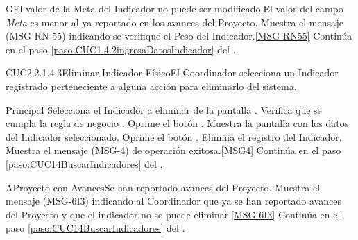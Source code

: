 	\begin{UCtrayectoriaA}{G}{El valor de la Meta del Indicador no puede ser modificado.}{El valor del campo \textit{Meta} es menor al ya reportado en los avances del Proyecto.}
			\UCpaso Muestra el mensaje (MSG-RN-55) indicando se verifique el Peso del Indicador.\ref{MSG-RN55}
			\UCpaso Continúa en el paso \ref{paso:CUC1.4.2ingresaDatosIndicador} del .
	\end{UCtrayectoriaA}
	\begin{UseCase}{CUC2.2.1.4.3}{Eliminar Indicador Físico}{El Coordinador selecciona un Indicador registrado perteneciente a alguna acción para eliminarlo del sistema.}
	\end{UseCase}

	\begin{UCtrayectoria}{Principal}
			\UCpaso [\UCactor] Selecciona el Indicador a eliminar de la pantalla  .
			\UCpaso Verifica que se cumpla la regla de negocio .
			\UCpaso[\UCactor] Oprime el botón .
			\UCpaso Muestra la pantalla  con los datos del Indicador seleccionado.
			\UCpaso [\UCactor] Oprime el botón . 
			\UCpaso Elimina el registro del Indicador.
			\UCpaso Muestra el mensaje (MSG-4) de operación exitosa.\ref{MSG4}
			\UCpaso Continúa en el paso \ref{paso:CUC14BuscarIndicadores} del .
	\end{UCtrayectoria}
		\begin{UCtrayectoriaA}{A}{Proyecto con Avances}{Se han reportado avances del Proyecto.}
			\UCpaso Muestra el mensaje (MSG-6I3) indicando al Coordinador que ya se han reportado avances del Proyecto y que el indicador no se puede eliminar.\ref{MSG-6I3}
			\UCpaso Continúa en el paso \ref{paso:CUC14BuscarIndicadores} del .
		\end{UCtrayectoriaA}

